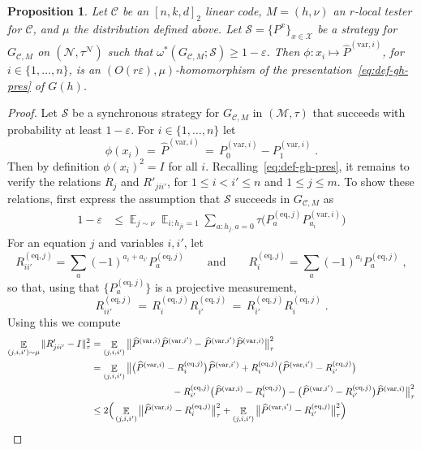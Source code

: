 \documentclass[11pt]{article}
\newtheorem{proposition}[theorem]{Proposition}
\theoremstyle{definition}
\newcommand{\code}{\mathscr{C}}
\newcommand{\strategy}{\mathscr{S}}
\newcommand{\Id}{\ensuremath{I}}
\DeclareMathOperator*{\Expectation}{\mathbb{E}}
\newcommand{\Es}[1]{\Expectation_{#1}}
\newcommand{\mM}{\ensuremath{\mathcal{M}}}
\newcommand{\mX}{\ensuremath{\mathcal{X}}}
\newcommand{\eps}{\varepsilon}
\newcommand{\mN}{\mathcal{N}}
\newcommand{\eq}{\mathrm{eq}}
\newcommand{\var}{\mathrm{var}}
\begin{document}
\begin{proposition}\label{prop:rep-game}
Let $\code$ be an $[n,k,d]_2$ linear code, $M=(h,\nu)$ an $r$-local tester for $\code$, and $\mu$ the distribution defined above. Let $\strategy = \{P^{x}\}_{x \in \mX}$ be a strategy for $G_{\code,M}$ on $(\mN,\tau^\mN)$ such that $\omega^*(G_{\code,M};\strategy)\geq 1-\eps$. Then $\phi:x_i\mapsto {\widehat{P}}^{(\var,i)}$, for $i\in\{1,\ldots,n\}$, is an $(O(r\eps),\mu)$-homomorphism of the presentation~\eqref{eq:def-gh-pres} of $G(h)$.
\end{proposition}

\begin{proof}
Let $\strategy$ be a synchronous strategy for $G_{\code,M}$  in  $(\mM,\tau)$ that succeeds with probability at least $1-\eps$. For $i\in\{1,\ldots,n\}$ let 
\[ \phi(x_i)\,=\,{\widehat{P}}^{(\var,i)}\,=\, P^{(\var,i)}_0-P^{(\var,i)}_1\;.\]
Then by definition $\phi(x_i)^2=\Id$ for all $i$. Recalling~\eqref{eq:def-gh-pres}, it remains to verify the relations $R_j$ and $R'_{jii'}$, for $1\leq i<i'\leq n$ and $1\leq j \leq m$. To show these relations, first express the assumption that $\strategy$ succeeds in $G_{\code,M}$ as
\begin{align}
1-\eps &\leq \Es{j\sim \nu} \Es{i: h_{ji}=1} \sum_{a:h_{j\cdot} a=0}\tau\big(P^{(\eq,j)}_a P^{(\var,i)}_{a_i}\big)\label{eq:rep-game-1}
\end{align}
For an equation $j$ and variables $i,i'$, let 
\[ R^{(\eq,j)}_{ii'} = \sum_a (-1)^{a_i+a_{i'}} P^{(\eq,j)}_a\qquad\text{and}\qquad R^{(\eq,j)}_{i} = \sum_a (-1)^{a_i}P^{(\eq,j)}_a\;,\]
so that, using that $\{P^{(\eq,j)}_a\}$ is a projective measurement, 
\[R^{(\eq,j)}_{ii'} \,=\, R^{(\eq,j)}_{i}R^{(\eq,j)}_{i'}\,=\,R^{(\eq,j)}_{i'}R^{(\eq,j)}_{i}\;.\]
Using this we compute
\begin{align*}
\Es{(j,i,i')\sim\mu} \|R'_{jii'}-\Id\|_\tau^2 &= \Es{(j,i,i')} \big\| \widehat{P}^{(\var,i)}\widehat{P}^{(\var,i')} - \widehat{P}^{(\var,i')}\widehat{P}^{(\var,i)}\big\|_\tau^2\\
&= \Es{(j,i,i')} \big\| \big(\widehat{P}^{(\var,i)} - R^{(\eq,j)}_{i}\big)\widehat{P}^{(\var,i')} + R^{(\eq,j)}_{i}\big(\widehat{P}^{(\var,i')}-R^{(\eq,j)}_{i'}\big)  \\
&\hskip3cm - R^{(\eq,j)}_{i'}\big(\widehat{P}^{(\var,i)}-R^{(\eq,j)}_{i}\big)- \big(\widehat{P}^{(\var,i')}- R^{(\eq,j)}_{i'}\big)\widehat{P}^{(\var,i)}  \big\|_\tau^2\\
&\leq 2\Big( \Es{(j,i,i')} \big\| \widehat{P}^{(\var,i)} - R^{(\eq,j)}_{i}\big\|_\tau^2 +\Es{(j,i,i')} \big\| \widehat{P}^{(\var,i')} - R^{(\eq,j)}_{i'}\big\|_\tau^2\Big)\\

\end{align*}
\end{proof}
\end{document}
